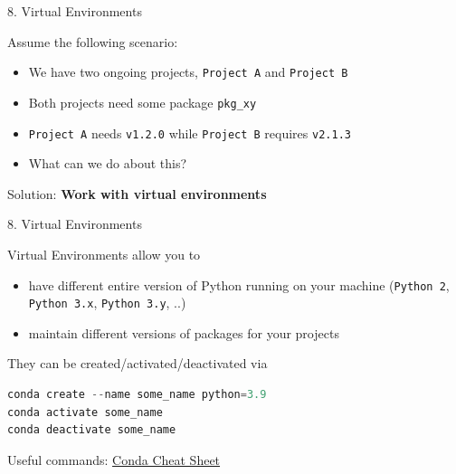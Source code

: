\documentclass[11pt,compress,t,notes=noshow, xcolor=table]{beamer}
\begin{document}
\begin{vbframe}{8. Virtual Environments}

\vfill

Assume the following scenario:

\begin{itemize}
	\item We have two ongoing projects, \texttt{Project A} and \texttt{Project B}
	\item Both projects need some package \texttt{pkg\_xy}
	\item \texttt{Project A} needs \texttt{v1.2.0} while \texttt{Project B} requires \texttt{v2.1.3}
	\item What can we do about this?
\end{itemize}

\vspace{.2cm}

Solution: \textbf{Work with virtual environments}


\vfill

\end{vbframe}


\begin{vbframe}{8. Virtual Environments}

\vfill

Virtual Environments allow you to 

\begin{itemize}
	\item have different entire version of Python running on your machine (\texttt{Python 2}, \texttt{Python 3.x}, \texttt{Python 3.y}, ..)
	\item maintain different versions of packages for your projects
\end{itemize}

\vspace{.3cm}

They can be created/activated/deactivated via

\begin{lstlisting}[language=python]
conda create --name some_name python=3.9
conda activate some_name
conda deactivate some_name
\end{lstlisting}

Useful commands: \href{https://docs.conda.io/projects/conda/en/4.6.0/_downloads/52a95608c49671267e40c689e0bc00ca/conda-cheatsheet.pdf}{Conda Cheat Sheet}

\vfill

\end{vbframe}
\end{document}
